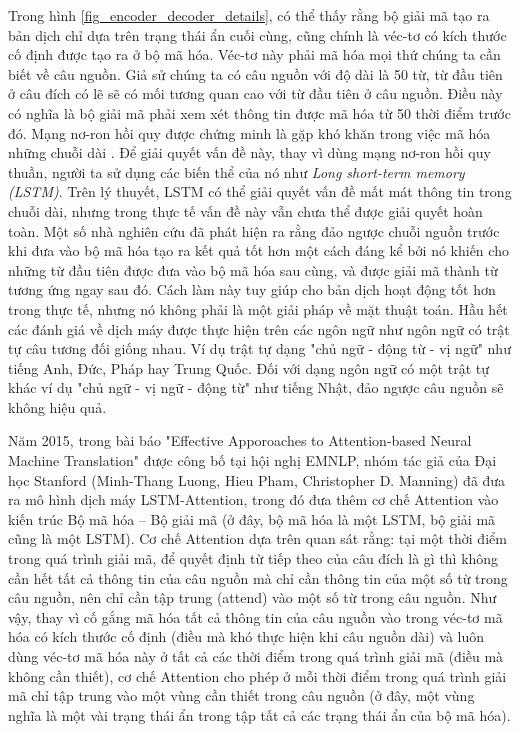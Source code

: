 Trong hình \ref{fig_encoder_decoder_details}, có thể thấy rằng bộ giải mã tạo ra bản dịch chỉ dựa trên trạng thái ẩn cuối cùng, cũng chính là véc-tơ có kích thước cố định được tạo ra ở bộ mã hóa. Véc-tơ này phải mã hóa mọi thứ chúng ta cần biết về câu nguồn. Giả sử chúng ta có câu nguồn với độ dài là 50 từ, từ đầu tiên ở câu đích có lẽ sẽ có mối tương quan cao với từ đầu tiên ở câu nguồn. Điều này có nghĩa là bộ giải mã phải xem xét thông tin được mã hóa từ 50 thời điểm trước đó. Mạng nơ-ron hồi quy được chứng minh là gặp khó khăn trong việc mã hóa những chuỗi dài \cite{pascanu2011}. Để giải quyết vấn đề này, thay vì dùng mạng nơ-ron hồi quy thuần, người ta sử dụng các biến thể của nó như \textit{Long short-term memory (LSTM)}. Trên lý thuyết, LSTM có thể giải quyết vấn đề mất mát thông tin trong chuỗi dài, nhưng trong thực tế vấn đề này vẫn chưa thể được giải quyết hoàn toàn. Một số nhà nghiên cứu đã phát hiện ra rằng đảo ngược chuỗi nguồn trước khi đưa vào bộ mã hóa tạo ra kết quả tốt hơn một cách đáng kể \cite{Seq2Seq2014} bởi nó khiến cho những từ đầu tiên được đưa vào bộ mã hóa sau cùng, và được giải mã thành từ tương ứng ngay sau đó. Cách làm này tuy giúp cho bản dịch hoạt động tốt hơn trong thực tế, nhưng nó không phải là một giải pháp về mặt thuật toán. Hầu hết các đánh giá về dịch máy được thực hiện trên các ngôn ngữ như ngôn ngữ có trật tự câu tương đối giống nhau. Ví dụ trật tự dạng "chủ ngữ - động từ - vị ngữ" như tiếng Anh, Đức, Pháp hay Trung Quốc. Đối với dạng ngôn ngữ có một trật tự khác ví dụ "chủ ngữ - vị ngữ - động từ" như tiếng Nhật, đảo ngược câu nguồn sẽ không hiệu quả.

Năm 2015, trong bài báo "Effective Apporoaches to Attention-based Neural Machine Translation" \cite{attentionThangLuong2015} được công bố tại hội nghị EMNLP, nhóm tác giả của Đại học Stanford (Minh-Thang Luong, Hieu Pham, Christopher D. Manning) đã đưa ra mô hình dịch máy LSTM-Attention, trong đó đưa thêm cơ chế Attention vào kiến trúc Bộ mã hóa – Bộ giải mã (ở đây, bộ mã hóa là một LSTM, bộ giải mã cũng là một LSTM). Cơ chế Attention dựa trên quan sát rằng: tại một thời điểm trong quá trình giải mã, để quyết định từ tiếp theo của câu đích là gì thì không cần hết tất cả thông tin của câu nguồn mà chỉ cần thông tin của một số từ trong câu nguồn, nên chỉ cần tập trung (attend) vào một số từ trong câu nguồn. Như vậy, thay vì cố gắng mã hóa tất cả thông tin của câu nguồn vào trong véc-tơ mã hóa có kích thước cố định (điều mà khó thực hiện khi câu nguồn dài) và luôn dùng véc-tơ mã hóa này ở tất cả các thời điểm trong quá trình giải mã (điều mà không cần thiết), cơ chế Attention cho phép ở mỗi thời điểm trong quá trình giải mã chỉ tập trung vào một vùng cần thiết trong câu nguồn (ở đây, một vùng nghĩa là một vài trạng thái ẩn trong tập tất cả các trạng thái ẩn của bộ mã hóa).

